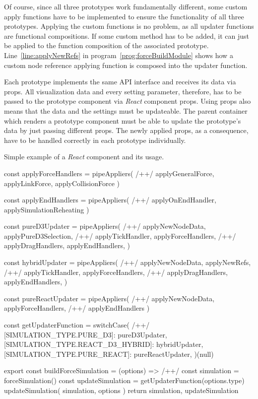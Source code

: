 Of course, since all three prototypes work fundamentally different, some custom apply functions have to be implemented to ensure the functionality of all three prototypes. Applying the custom functions is no problem, as all updater functions are functional compositions. If some custom method has to be added, it can just be applied to the function composition of the associated prototype. Line~\ref{line:applyNewRefs} in program~\ref{prog:forceBuildModule} shows how a custom node reference applying function is composed into the updater function.

Each prototype implements the same API interface and receives its data via props. All visualization data and every setting parameter, therefore, has to be passed to the prototype component via \emph{React} component props. Using props also means that the data and the settings must be updateable. The parent container which renders a prototype component must be able to update the prototype's data by just passing different props. The newly applied props, as a consequence, have to be handled correctly in each prototype individually.

\begin{program}
\caption{Simple example of a \emph{React} component and its usage.} 
\label{prog:forceBuildModule}
\begin{JsCode}
const applyForceHandlers = pipeAppliers( /+\label{line:composition1}+/
  applyGeneralForce, 
  applyLinkForce, 
  applyCollisionForce
)

const applyEndHandlers = pipeAppliers( /+\label{line:composition2}+/
  applyOnEndHandler, 
  applySimulationReheating
)

const pureD3Updater = pipeAppliers( /+\label{line:updater1}+/
  applyNewNodeData,
  applyPureD3Selection, /+\label{line:applyPureD3Selection}+/
  applyTickHandler,
  applyForceHandlers, /+\label{line:applyForce1}+/
  applyDragHandlers,
  applyEndHandlers,
)

const hybridUpdater = pipeAppliers( /+\label{line:updater2}+/
  applyNewNodeData,
  applyNewRefs, /+\label{line:applyNewRefs}+/
  applyTickHandler,
  applyForceHandlers, /+\label{line:applyForce2}+/
  applyDragHandlers,
  applyEndHandlers,
)

const pureReactUpdater = pipeAppliers( /+\label{line:updater3}+/
  applyNewNodeData, 
  applyForceHandlers, /+\label{line:applyForce3}+/
  applyEndHandlers
)

const getUpdaterFunction = switchCase({ /+\label{line:getUpdaterFunction}+/
  [SIMULATION_TYPE.PURE_D3]: pureD3Updater,
  [SIMULATION_TYPE.REACT_D3_HYBRID]: hybridUpdater,
  [SIMULATION_TYPE.PURE_REACT]: pureReactUpdater,
})(null)

export const buildForceSimulation = (options) => { /+\label{line:buildForceSimulationFn}+/
  const simulation = forceSimulation()
  const updateSimulation = getUpdaterFunction(options.type)
  updateSimulation({ simulation, options })
  return { simulation, updateSimulation }
}
\end{JsCode}
\end{program}

